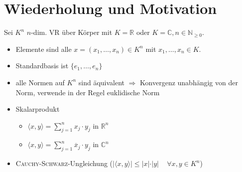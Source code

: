 \section{Wiederholung und Motivation}
Sei $K^n$ $n$-dim. VR über Körper mit $K=\mathbb{R}$ oder $K=\mathbb{C}, n\in\mathbb{N}_{\ge 0}$.
\begin{itemize}
	\item Elemente sind alle $x=(x_1, \dotsc, x_n)\in K^n$ mit $x_1, \dotsc, x_n\in K$.
	\item Standardbasis ist $\{e_1, \dotsc, e_n\}$
	\item alle Normen auf $K^n$ sind äquivalent $\Rightarrow$ Konvergenz unabhängig von der Norm, verwende in der Regel euklidische Norm
	\item Skalarprodukt
	\begin{itemize}
		\item $\langle x,y \rangle = \sum\limits_{j=1}^{n} x_j\cdot y_j$ in $\mathbb{R}^n$
		\item $\langle x,y \rangle = \sum\limits_{j=1}^{n} \overline{x}_j\cdot y_j$ in $\mathbb{C}^n$
	\end{itemize}
	\item \textsc{Cauchy}-\textsc{Schwarz}-Ungleichung ($\vert \langle x,y\rangle \vert \le \vert x \vert \cdot \vert y \vert\,\quad\forall x,y\in K^n$)
\end{itemize}


